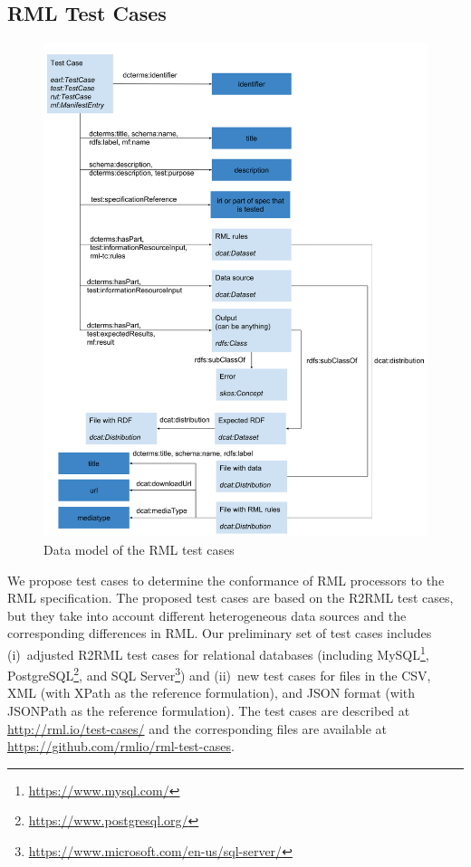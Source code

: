 \subsection{RML Test Cases}
\begin{figure}[!th]
\centering
\includegraphics[width=1\textwidth]{figures/rml_test_case_model.png}
\caption{Data model of the RML test cases}
\label{fig:datamodel}
\end{figure}

We propose test cases to determine the conformance of RML processors to the RML specification. The proposed test cases are based on the R2RML test cases, but they take into account different heterogeneous data sources and the corresponding differences in RML. Our preliminary set of test cases includes (i)~adjusted R2RML test cases for relational databases (including MySQL\footnote{\url{https://www.mysql.com/}}, PostgreSQL\footnote{\url{https://www.postgresql.org/}}, and SQL Server\footnote{\url{https://www.microsoft.com/en-us/sql-server/}}) and (ii)~new test cases for files in the CSV, XML (with XPath as the reference formulation), and JSON format (with JSONPath as the reference formulation). The test cases are described at \url{http://rml.io/test-cases/} and the corresponding files are available at \url{https://github.com/rmlio/rml-test-cases}.

